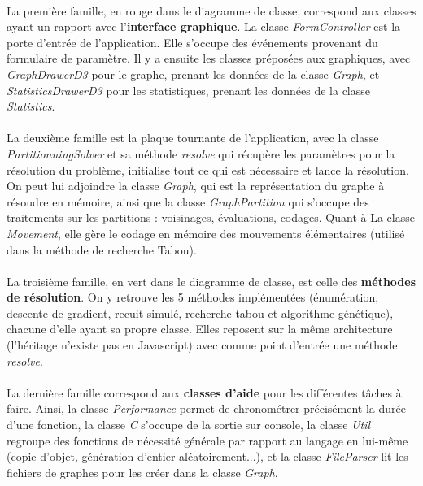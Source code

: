 \documentclass[12pt]{article}
\begin{document}
\paragraph{}La première famille, en rouge dans le diagramme de classe, correspond aux classes ayant un rapport avec l'\textbf{interface graphique}. La classe \textit{FormController} est la porte d'entrée de l'application. Elle s'occupe des événements provenant du formulaire de paramètre. Il y a ensuite les classes préposées aux graphiques, avec \textit{GraphDrawerD3} pour le graphe, prenant les données de la classe \textit{Graph}, et \textit{StatisticsDrawerD3} pour les statistiques, prenant les données de la classe \textit{Statistics}.

\paragraph{}La deuxième famille est la plaque tournante de l'application, avec la classe \textit{PartitionningSolver} et sa méthode \textit{resolve} qui récupère les paramètres pour la résolution du problème, initialise tout ce qui est nécessaire et lance la résolution. On peut lui adjoindre la classe \textit{Graph}, qui est la représentation du graphe à résoudre en mémoire, ainsi que la classe \textit{GraphPartition} qui s'occupe des traitements sur les partitions : voisinages, évaluations, codages. Quant à La classe \textit{Movement}, elle gère le codage en mémoire des mouvements élémentaires (utilisé dans la méthode de recherche Tabou).

\paragraph{}La troisième famille, en vert dans le diagramme de classe, est celle des \textbf{méthodes de résolution}. On y retrouve les 5 méthodes implémentées (énumération, descente de gradient, recuit simulé, recherche tabou et algorithme génétique), chacune d'elle ayant sa propre classe. Elles reposent sur la même architecture (l'héritage n'existe pas en Javascript) avec comme point d'entrée une méthode \textit{resolve}.

\paragraph{}La dernière famille correspond aux \textbf{classes d'aide} pour les différentes tâches à faire. Ainsi, la classe \textit{Performance} permet de chronométrer précisément la durée d'une fonction, la classe \textit{C} s'occupe de la sortie sur console, la classe \textit{Util} regroupe des fonctions de nécessité générale par rapport au langage en lui-même (copie d'objet, génération d'entier aléatoirement...), et la classe \textit{FileParser} lit les fichiers de graphes pour les créer dans la classe \textit{Graph}.
\end{document}
